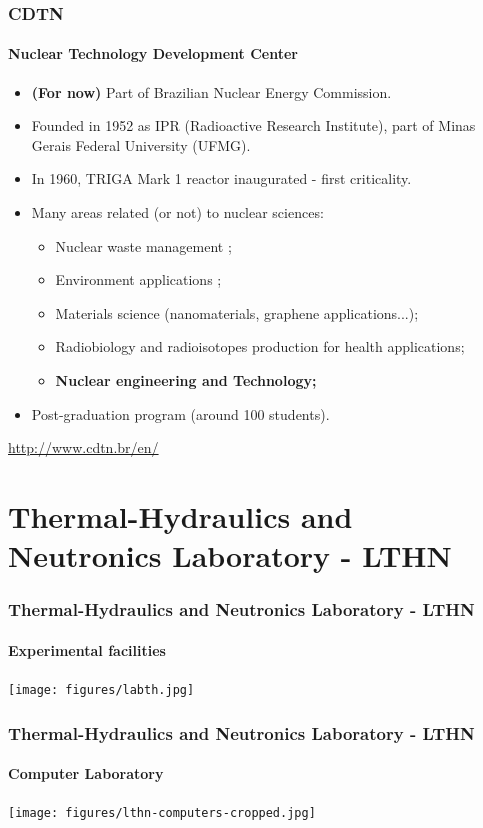 \documentclass[svgnames,smaller,table,draft]{beamer}
\begin{document}
\begin{frame}
  \frametitle{CDTN}
  \framesubtitle{Nuclear Technology Development Center}
  \begin{itemize}
    \item \textbf{(For now)} Part of Brazilian Nuclear Energy Commission.
  \item Founded in 1952 as IPR (Radioactive Research Institute), part of
    Minas Gerais Federal University (UFMG).
  \item In 1960, TRIGA Mark 1 reactor inaugurated - first criticality.
  \item Many areas related (or not) to nuclear sciences:
    \begin{itemize}
    \item Nuclear waste management \cite{Antonella2002};
    \item Environment applications \cite{Antonella2003};
    \item Materials science (nanomaterials, graphene applications...);
    \item Radiobiology and radioisotopes production for health applications;
    \item \textbf{Nuclear engineering and Technology;}
    \end{itemize}
  \item Post-graduation program (around 100 students).
  \end{itemize}
  \begin{center}
    \url{http://www.cdtn.br/en/}
    \end{center}
\end{frame}


\section{Thermal-Hydraulics and Neutronics Laboratory - LTHN}
\begin{frame}
  \frametitle{Thermal-Hydraulics and Neutronics Laboratory - LTHN}
  \framesubtitle{Experimental facilities}
  \begin{center}
    \texttt{[image: figures/labth.jpg]}
  \end{center}
\end{frame}

\begin{frame}
  \frametitle{Thermal-Hydraulics and Neutronics Laboratory - LTHN}
  \framesubtitle{Computer Laboratory}
  \begin{center}
    \texttt{[image: figures/lthn-computers-cropped.jpg]}
  \end{center}
\end{frame}
\end{document}
